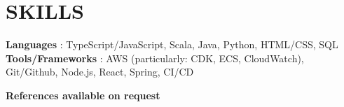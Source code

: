 \documentclass[letterpaper,11pt]{article}
\begin{document}
\section{SKILLS}
 \begin{itemize}[leftmargin=0in, label={}]
    \small{\item{
     \textbf{Languages} {: TypeScript/JavaScript, Scala, Java, Python, HTML/CSS, SQL}\vspace{2pt} \\
     \textbf{Tools/Frameworks}     {: AWS (particularly: CDK, ECS, CloudWatch), Git/Github, Node.js, React, Spring, CI/CD}
    }}
 \end{itemize}

\textbf{References available on request}

\end{document}
